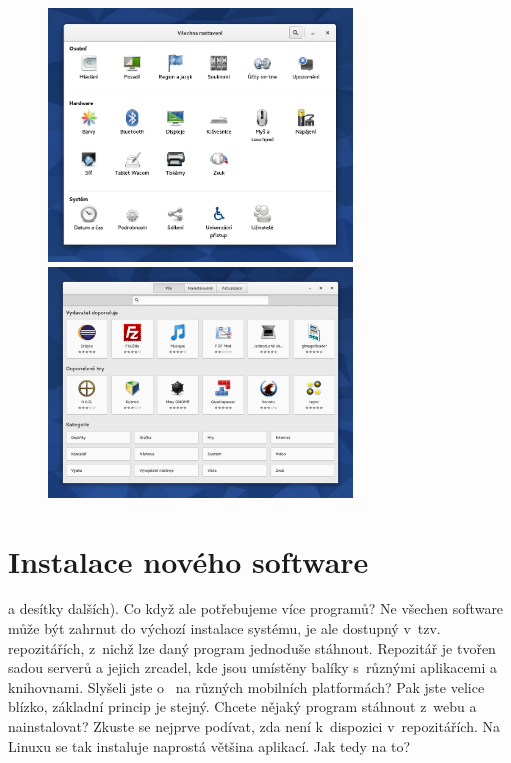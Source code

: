\begin{figure}[p]
\begin{center}
\includegraphics[width=0.72\textwidth]{img/nastaveni}
 \label{fig:nastaveni}
\bigskip
\includegraphics[width=0.72\textwidth]{img/software}
 \label{fig:software}
\end{center}
\end{figure}

\section*{Instalace nového software}
 a desítky dalších). Co když ale potřebujeme více programů? Ne všechen software může být zahrnut do výchozí instalace systému, je ale dostupný v~tzv. repozitářích, z~nichž lze daný program jednoduše stáhnout. Repozitář je tvořen sadou serverů a jejich zrcadel, kde jsou umístěny balíky s~různými aplikacemi a knihovnami. Slyšeli jste o~ na různých mobilních platformách? Pak jste velice blízko, základní princip je stejný. Chcete nějaký program stáhnout z~webu a nainstalovat? Zkuste se nejprve podívat, zda není k~dispozici v~repozitářích. Na Linuxu se tak instaluje naprostá většina aplikací. Jak tedy na to?

